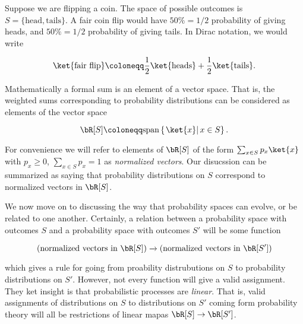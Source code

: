 \begin{ex}
Suppose we are flipping a coin. The space of possible outcomes is $S=\{\text{head},\text{tails}\}$. A fair coin flip would have $50\%=1/2$ probability of giving heads, and $50\%=1/2$ probability of giving tails. In Dirac notation, we would write

$$\ket{\text{fair flip}}\coloneqq\frac{1}{2}\ket{\text{heads}}+\frac{1}{2}\ket{\text{tails}}.$$

\end{ex}

Mathematically a formal sum is an element of a vector space. That is, the weighted sums corresponding to probability distributions can be considered as elements of the vector space

$$\bR[S]\coloneqq \text{span} \left\{\left.\ket{x}\right| x\in S\right\}.$$

For convenience we will refer to elements of $\bR[S]$ of the form $\sum_{x\in S}p_x \ket{x}$ with $p_x\geq 0$, $\sum_{x\in S}p_x=1$ as {\em normalized vectors}. Our disucssion can be summarized as saying that probability distributions on $S$ correspond to normalized vectors in $\bR[S]$.

We now move on to discussing the way that probability spaces can evolve, or be related to one another. Certainly, a relation between a probability space with outcomes $S$ and a probability space with outcomes $S'$ will be some function

$$\left(\text{normalized vectors in }\bR[S]\right)\xrightarrow{}\left(\text{normalized vectors in }\bR[S']\right)$$

which gives a rule for going from proability distrubutions on $S$ to probability distributions on $S'$. However, not every function will give a valid assignment. They ket insight is that probabilistic processes are {\em linear}. That is, valid assignments of distributions on $S$ to distributions on $S'$ coming form probability theory will all be restrictions of linear mapas $\bR[S]\to\bR[S']$.


